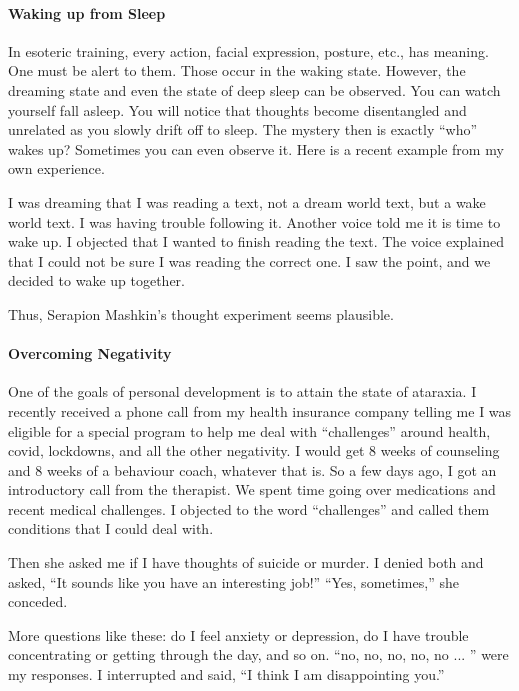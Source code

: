\paragraph{Waking up from Sleep}


In esoteric training, every action, facial expression, posture, etc., has meaning. One must be alert to them. Those occur in the waking state. However, the dreaming state and even the state of deep sleep can be observed. You can watch yourself fall asleep. You will notice that thoughts become disentangled and unrelated as you slowly drift off to sleep. The mystery then is exactly ``who'' wakes up? Sometimes you can even observe it. Here is a recent example from my own experience.

\begin{quotex}
I was dreaming that I was reading a text, not a dream world text, but a wake world text. I was having trouble following it. Another voice told me it is time to wake up. I objected that I wanted to finish reading the text. The voice explained that I could not be sure I was reading the correct one. I saw the point, and we decided to wake up together.
\end{quotex}


Thus, Serapion Mashkin's thought experiment seems plausible.

\paragraph{Overcoming Negativity}


One of the goals of personal development is to attain the state of ataraxia. I recently received a phone call from my health insurance company telling me I was eligible for a special program to help me deal with ``challenges'' around health, covid, lockdowns, and all the other negativity. I would get 8 weeks of counseling and 8 weeks of a behaviour coach, whatever that is. So a few days ago, I got an introductory call from the therapist. We spent time going over medications and recent medical challenges. I objected to the word ``challenges'' and called them conditions that I could deal with.

Then she asked me if I have thoughts of suicide or murder. I denied both and asked, ``It sounds like you have an interesting job!'' ``Yes, sometimes,'' she conceded.

More questions like these: do I feel anxiety or depression, do I have trouble concentrating or getting through the day, and so on. ``no, no, no, no, no ... '' were my responses. I interrupted and said, ``I think I am disappointing you.''

